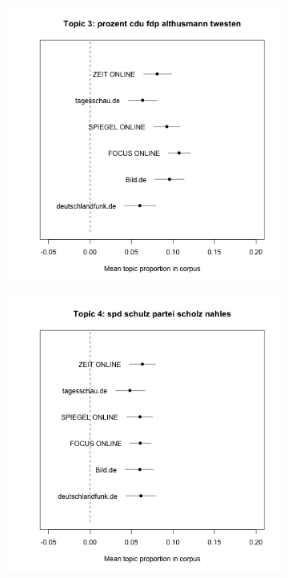 \documentclass[12pt,a4paper,notitlepage]{article}
\begin{document}
\begin{figure}[H]
\begin{center}
\begin{subfigure}[normla]{0.2\textwidth}
		\end{subfigure}
				\begin{subfigure}[normla]{0.2\textwidth}
			\includegraphics[width=\textwidth]{../figs/estimate_effect3.png}
		\end{subfigure}
				\begin{subfigure}[normla]{0.2\textwidth}
			\includegraphics[width=\textwidth]{../figs/estimate_effect4.png}

\end{subfigure}
\end{center}
\end{figure}
\end{document}
